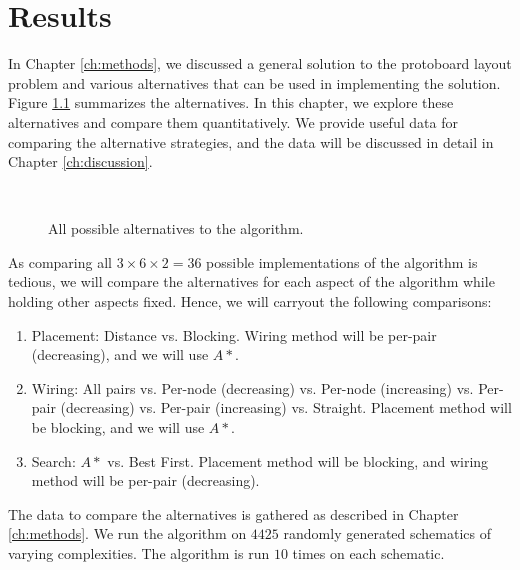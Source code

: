 
\chapter{Results}
\label{ch:results}

In Chapter \ref{ch:methods}, we discussed a general solution to the protoboard
layout problem and various alternatives that can be used in implementing the
solution. Figure \ref{fig:alternatives} summarizes the alternatives.
In this chapter, we explore these alternatives and compare them quantitatively.
We provide useful data for comparing the alternative strategies,
and the data will be discussed in detail in Chapter \ref{ch:discussion}.

\begin{figure}[H]
\centering
{}
\hspace{1cm}
\\
\label{fig:alternatives}
\caption{All possible alternatives to the algorithm.}
\end{figure}

As comparing all $3 \times 6 \times 2 = 36$ possible implementations of the
algorithm is tedious, we
will compare the alternatives for each aspect of the algorithm while holding
other aspects fixed. Hence, we will carryout the following comparisons:

\begin{enumerate}
\item Placement: Distance vs. Blocking. Wiring method will be per-pair
(decreasing), and we will use $A*$.
\item Wiring: All pairs vs. Per-node (decreasing) vs. Per-node (increasing) vs.
Per-pair (decreasing) vs. Per-pair (increasing) vs. Straight.
Placement method will be blocking, and we will use $A*$.
\item Search: $A*$ vs. Best First. Placement method will be blocking, and wiring
method will be per-pair (decreasing).
\end{enumerate}

The data to compare the alternatives is gathered as described in Chapter
\ref{ch:methods}. We run the algorithm on $4425$ randomly generated schematics
of varying complexities. The algorithm is run $10$ times on each schematic.

